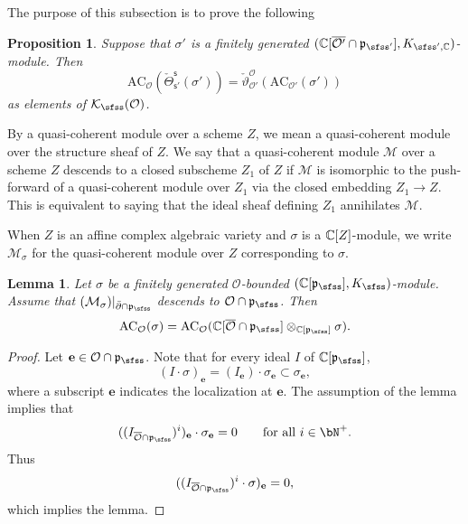 \documentclass[12pt,a4paper]{amsart}
\newcommand{\CK}{{\mathcal {K}}}
\newcommand{\CM}{{\mathcal {M}}}
\newcommand{\CO}{{\mathcal {O}}}
\newcommand{\p}{\mathfrak p}
\numberwithin{equation}{section}
\newtheorem{lem}[thm]{Lemma}
\newtheorem{prop}[thm]{Proposition}
\theoremstyle{remark}
\begin{document}
The purpose of this subsection is to prove the following 
\begin{prop}\label{propthetag}
Suppose that $\sigma'$ is a finitely generated  $(\C[\overline{\CO'}\cap \p_{\sfss'}], K_{\sfss', \C})$-module. Then
\[
\mathrm{AC}_{\CO}( \check \Theta_{\mathsf s'}^{\mathsf s}(\sigma'))= \check \vartheta_{\CO'}^{\CO}(\mathrm{AC}_{\CO'}(\sigma'))
\]
as elements of $\CK_\sfss(\CO)$.

\end{prop}


By a quasi-coherent module over a scheme $Z$, we mean a quasi-coherent module over the structure sheaf of $Z$. We say that a quasi-coherent module $\CM$ over a scheme $Z$ descends to a closed subscheme $Z_1$ of $Z$ if $\CM$ is isomorphic to the push-forward of a
 quasi-coherent module over $Z_1$ via the closed embedding $Z_1\rightarrow Z$. This is equivalent to saying that the ideal sheaf defining $Z_1$ annihilates $\CM$.

When $Z$ is an affine complex algebraic variety and $\sigma$ is a $\mathbb{C}[Z]$-module,
 we write $\CM_\sigma$ for  the quasi-coherent module over $Z$ corresponding to $\sigma$.

\begin{lem}\label{geotheta1}
Let $\sigma$ be a finitely generated $\CO$-bounded $(\C[\p_{\sfss}],K_{\sfss})$-module.  Assume that  $(\CM_\sigma)|_{\bar \partial\cap \p_\sfss}$ descends to $\CO\cap \p_\sfss$. Then
\[
  \mathrm{AC}_{\CO}(\sigma)=\mathrm{AC}_{\CO}(\C[\overline \CO\cap \p_{\sfss}]\otimes_{\C[\p_{\sfss}]} \sigma).
\]
\end{lem}
\begin{proof}
Let $\mathbf e\in \CO\cap \p_\sfss$. Note that for every ideal $I$ of $\C[\p_{\sfss}]$,
\[
  (I\cdot \sigma)_\mathbf e=(I_\mathbf e)\cdot \sigma_\mathbf e\subset  \sigma_\mathbf e,
\]
where a subscript $\mathbf e$ indicates the localization at $\mathbf e$. The assumption of the lemma implies that
\[
  ((I_{\overline{\CO}\cap \p_\sfss})^i)_\mathbf e \cdot \sigma_\mathbf e=0\qquad \textrm{for all } i\in \bN^+.
\]
Thus
\[
  ((I_{\overline{\CO}\cap \p_\sfss})^i \cdot \sigma)_\mathbf e=0,
\]
which implies the  lemma.
\end{proof}
\end{document}
